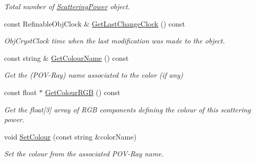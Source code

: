 \begin{DoxyCompactItemize}
\begin{DoxyCompactList}\small\item\em Total number of \mbox{\hyperlink{class_obj_cryst_1_1_scattering_power}{Scattering\+Power}} object. \end{DoxyCompactList}\item 
\mbox{\label{class_obj_cryst_1_1_scattering_power_a5467cc5ed85cfc6829e3d94c669849de}} 
const Refinable\+Obj\+Clock \& \mbox{\hyperlink{class_obj_cryst_1_1_scattering_power_a5467cc5ed85cfc6829e3d94c669849de}{Get\+Last\+Change\+Clock}} () const
\begin{DoxyCompactList}\small\item\em Obj\+Cryst\+Clock time when the last modification was made to the object. \end{DoxyCompactList}\item 
\mbox{\label{class_obj_cryst_1_1_scattering_power_a6870902b64ba978d515dadec09d9c178}} 
const string \& \mbox{\hyperlink{class_obj_cryst_1_1_scattering_power_a6870902b64ba978d515dadec09d9c178}{Get\+Colour\+Name}} () const
\begin{DoxyCompactList}\small\item\em Get the (P\+O\+V-\/\+Ray) name associated to the color (if any) \end{DoxyCompactList}\item 
\mbox{\label{class_obj_cryst_1_1_scattering_power_a394219949f4e26130d3a6c06725d3bba}} 
const float $\ast$ \mbox{\hyperlink{class_obj_cryst_1_1_scattering_power_a394219949f4e26130d3a6c06725d3bba}{Get\+Colour\+R\+GB}} () const
\begin{DoxyCompactList}\small\item\em Get the float\mbox{[}3\mbox{]} array of R\+GB components defining the colour of this scattering power. \end{DoxyCompactList}\item 
\mbox{\label{class_obj_cryst_1_1_scattering_power_ac48cb91ee4361a14d829227023479514}} 
void \mbox{\hyperlink{class_obj_cryst_1_1_scattering_power_ac48cb91ee4361a14d829227023479514}{Set\+Colour}} (const string \&color\+Name)
\begin{DoxyCompactList}\small\item\em Set the colour from the associated P\+O\+V-\/\+Ray name. \end{DoxyCompactList}\item 

\end{DoxyCompactItemize}
